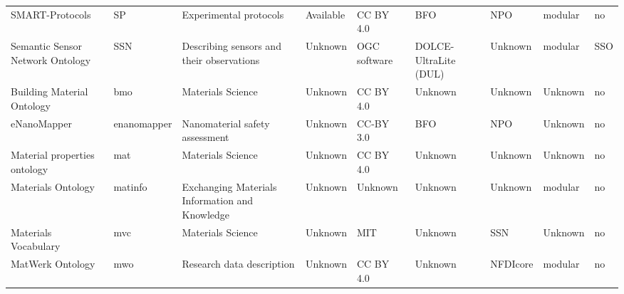 \begin{tabular}{m{5cm}m{2cm}m{5cm}m{2cm}m{2cm}m{2cm}m{2cm}m{2cm}m{2cm}}
                                               SMART-Protocols \cite{sp_ontology} &                      SP &                                                            Experimental protocols &            Available &    CC BY 4.0 &                          BFO &               NPO &    modular &               no \\
                             Semantic Sensor Network Ontology \cite{ssn_ontology} &                     SSN &                                         Describing sensors and their observations &              Unknown & OGC software &        DOLCE-UltraLite (DUL) &           Unknown &    modular &              SSO \\
                                                       Building Material Ontology &                     bmo &                                                                 Materials Science &              Unknown &    CC BY 4.0 &                      Unknown &           Unknown &    Unknown &               no \\
                                                   eNanoMapper \cite{enanomapper} &             enanomapper &                                                    Nanomaterial safety assessment &              Unknown &    CC-BY 3.0 &                          BFO &               NPO &    Unknown &               no \\
                                                     Material properties ontology &                     mat &                                                                 Materials Science &              Unknown &    CC BY 4.0 &                      Unknown &           Unknown &    Unknown &               no \\
                                                Materials Ontology \cite{matinfo} &                 matinfo &                                    Exchanging Materials Information and Knowledge &              Unknown &      Unknown &                      Unknown &           Unknown &    modular &               no \\
                                                             Materials Vocabulary &                     mvc &                                                                 Materials Science &              Unknown &         MIT  &                      Unknown &               SSN &    Unknown &               no \\
                                                                 MatWerk Ontology &                     mwo &                                                         Research data description &              Unknown &    CC BY 4.0 &                      Unknown &          NFDIcore &    modular &               no \\

\end{tabular}
